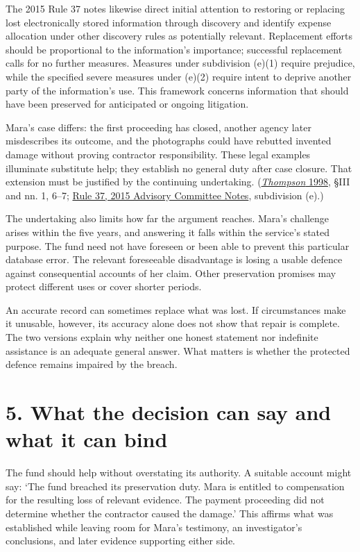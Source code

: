 The 2015 Rule 37 notes likewise direct initial attention to restoring or replacing lost electronically stored information through discovery and identify expense allocation under other discovery rules as potentially relevant. Replacement efforts should be proportional to the information’s importance; successful replacement calls for no further measures. Measures under subdivision (e)(1) require prejudice, while the specified severe measures under (e)(2) require intent to deprive another party of the information’s use. This framework concerns information that should have been preserved for anticipated or ongoing litigation. 

Mara’s case differs: the first proceeding has closed, another agency later misdescribes its outcome, and the photographs could have rebutted invented damage without proving contractor responsibility. These legal examples illuminate substitute help; they establish no general duty after case closure. That extension must be justified by the continuing undertaking. (\hyperlink{ref:thompson1998}{\emph{Thompson} 1998}, §III and nn. 1, 6–7; \hyperlink{ref:rule37}{Rule 37, 2015 Advisory Committee Notes}, subdivision (e).)

The undertaking also limits how far the argument reaches. Mara’s challenge arises within the five years, and answering it falls within the service’s stated purpose. The fund need not have foreseen or been able to prevent this particular database error. The relevant foreseeable disadvantage is losing a usable defence against consequential accounts of her claim. Other preservation promises may protect different uses or cover shorter periods.

An accurate record can sometimes replace what was lost. If circumstances make it unusable, however, its accuracy alone does not show that repair is complete. The two versions explain why neither one honest statement nor indefinite assistance is an adequate general answer. What matters is whether the protected defence remains impaired by the breach.

\section*{5. What the decision can say and what it can bind}

The fund should help without overstating its authority. A suitable account might say: ‘The fund breached its preservation duty. Mara is entitled to compensation for the resulting loss of relevant evidence. The payment proceeding did not determine whether the contractor caused the damage.’ This affirms what was established while leaving room for Mara’s testimony, an investigator’s conclusions, and later evidence supporting either side.

